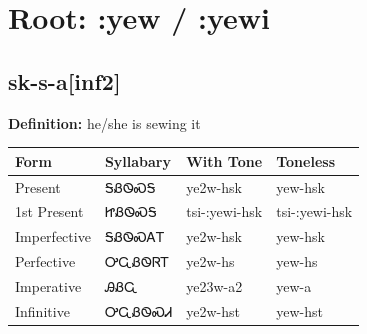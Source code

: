 \documentclass{article}%
\begin{document}
%
\normalsize%
\section*{Root: :yew / :yewi}%
\subsection*{sk-s-a[inf2]}%
\textbf{Definition: }%
he/she is sewing it%
\\[0.5em]%
\begin{tabular}{|l|l|l|l|}%
\hline%
\textbf{Form}&\textbf{Syllabary}&\textbf{With Tone}&\textbf{Toneless}\\%
\hline%
Present&ᎦᏰᏫᏍᎦ&ye2w{-}hsk&yew{-}hsk\\%
1st Present&ᏥᏰᏫᏍᎦ&tsi{-}:yewi{-}hsk&tsi{-}:yewi{-}hsk\\%
Imperfective&ᎦᏰᏫᏍᎪᎢ&ye2w{-}hsk&yew{-}hsk\\%
Perfective&ᎤᏩᏰᏫᏒᎢ&ye2w{-}hs&yew{-}hs\\%
Imperative&ᎯᏰᏩ&ye23w{-}a2&yew{-}a\\%
Infinitive&ᎤᏩᏰᏫᏍᏗ&ye2w{-}hst&yew{-}hst\\%
\hline%
\end{tabular}%
\\[1em]%
\end{document}
